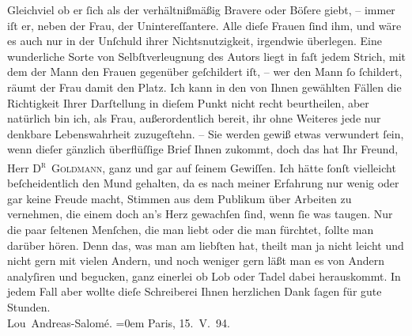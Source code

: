 \begin{ledgroupsized}[t]{13cm}
                    Gleichviel ob er ſich als der verhältnißmäßig Bravere oder Böſere giebt, – immer
                    iſt er, neben der Frau, der Unintereſſantere. Alle dieſe Frauen ſind ihm, und
                    wäre es auch nur in der Unſchuld ihrer Nichtsnutzigkeit, irgendwie überlegen.
                    Eine wunderliche Sorte von Selbſtverleugnung \introOben{}des Autors\introOben{}
                    liegt in faſt jedem Strich, mit dem der Mann den Frauen gegenüber geſchildert
                    iſt, {\pb}– wer den Mann ſo ſchildert,
                    räumt der Frau damit den Platz. Ich kann in den von Ihnen gewählten Fällen die
                    Richtigkeit Ihrer Darſtellung in dieſem Punkt nicht recht beurtheilen, aber
                    natürlich bin ich, als Frau, außerordentlich bereit, ihr ohne Weiteres jede nur
                    denkbare Lebenswahrheit zuzugeſtehn. –\pend
           \pstart
           Sie werden gewiß etwas verwundert ſein, wenn dieſer gänzlich überflüſſige Brief
                    Ihnen zukommt, doch das hat Ihr Freund, Herr \textsc{D\textsuperscript{r} }\textsc{Goldmann}, ganz und gar auf ſeinem Gewiſſen. Ich hätte ſonſt vielleicht
                    beſcheidentlich den Mund gehalten, da es nach meiner Erfahrung nur wenig oder
                    gar keine Freude macht, Stimmen aus dem Publikum über Arbeiten zu vernehmen, die
                    einem doch an's Herz gewachſen ſind, wenn ſie was taugen. Nur die paar ſeltenen
                    Menſchen, die man liebt oder die man fürchtet, ſollte man darüber hören. Denn
                    das, was man am liebſten hat, theilt man ja {\pb}nicht leicht und nicht gern mit
                    vielen Andern, und noch weniger gern läßt man es von Andern analyſiren und
                    begucken, ganz einerlei ob Lob oder Tadel dabei herauskommt.\pend
           \pstart
           In jedem Fall aber wollte dieſe Schreiberei Ihnen herzlichen Dank ſagen für
                    gute Stunden.{\\[\baselineskip]}\spacefill\mbox{Lou Andreas-Salomé.}\pend
           \leftskip=0em{}\pstart
           Paris, 15. V. 94.
                    \pend
           \endnumbering{}\end{ledgroupsized}  \newcommand{\dateiname}{L00325}\newcommand{\titel}{Lou Andreas-Salomé an Arthur Schnitzler, 15. 5. 1894}\newcommand{\editorInnen}{Martin Anton Müller und Gerd-Hermann Susen}
      